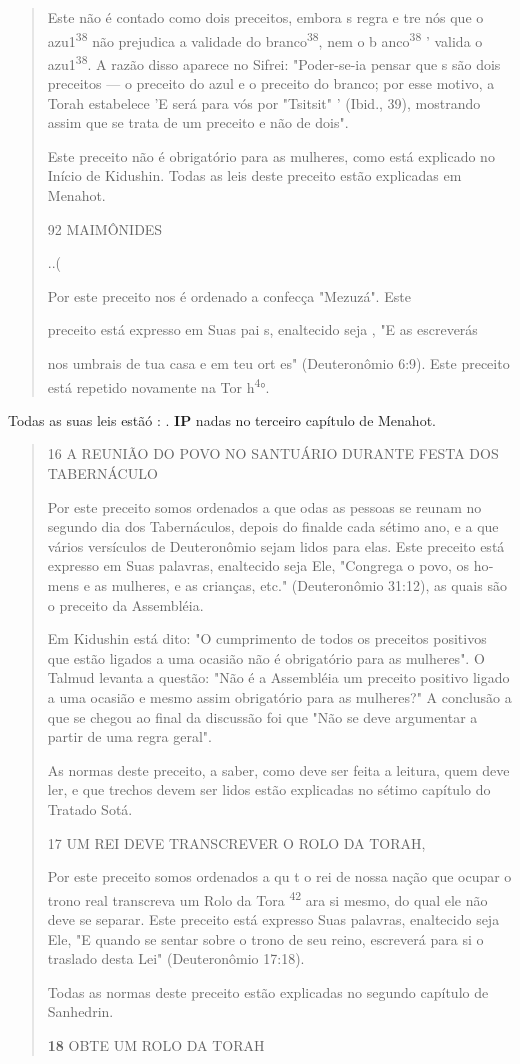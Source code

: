 \begin{quote}
Este não é contado como dois preceitos, embora s regra e tre nós que o
azu1\textsuperscript{38} não prejudica a validade do
branco\textsuperscript{38}, nem o b anco\textsuperscript{38} ' valida o
azu1\textsuperscript{38}. A razão disso aparece no Sifrei: "Poder-se-ia
pensar que s são dois preceitos --- o preceito do azul e o preceito do
branco; por esse motivo, a To­rah estabelece 'E será para vós por
"Tsitsit" ' (Ibid., 39), mostrando assim que se trata de um preceito e
não de dois".

Este preceito não é obrigatório para as mulheres, como está explicado no
Início de Kidushin. Todas as leis deste preceito estão explicadas em
Menahot.

92 MAIMÔNIDES

..(

Por este preceito nos é ordenado a confecça "Mezuzá". Este

preceito está expresso em Suas pai s, enaltecido seja , "E as escreverás

nos umbrais de tua casa e em teu ort es" (Deuteronômio 6:9). Este
preceito está repetido novamente na Tor h\textsuperscript{4}°.
\end{quote}

Todas as suas leis estãó : . \textbf{IP} nadas no terceiro capítulo de
Menahot.

\begin{quote}
16 A REUNIÃO DO POVO NO SANTUÁRIO DURANTE FESTA DOS TABERNÁCULO

Por este preceito somos ordenados a que odas as pessoas se reu­nam no
segundo dia dos Tabernáculos, depois do finalde cada sétimo ano, e a que
vários versículos de Deuteronômio sejam lidos para elas. Este preceito
está expresso em Suas palavras, enaltecido seja Ele, "Congrega o povo,
os ho­mens e as mulheres, e as crianças, etc." (Deuteronômio 31:12), as
quais são o preceito da Assembléia.

Em Kidushin está dito: "O cumprimento de todos os preceitos posi­tivos
que estão ligados a uma ocasião não é obrigatório para as mulheres". O
Talmud levanta a questão: "Não é a Assembléia um preceito positivo
ligado a uma ocasião e mesmo assim obrigatório para as mulheres?" A
conclusão a que se chegou ao final da discussão foi que "Não se deve
argumentar a partir de uma regra geral".

As normas deste preceito, a saber, como deve ser feita a leitura, quem
deve ler, e que trechos devem ser lidos estão explicadas no sétimo
capítulo do Tratado Sotá.

17 UM REI DEVE TRANSCREVER O ROLO DA TORAH,

Por este preceito somos ordenados a qu t o rei de nossa nação que ocupar
o trono real transcreva um Rolo da Tora \textsuperscript{42} ara si
mesmo, do qual ele não deve se separar. Este preceito está expresso Suas
palavras, enalteci­do seja Ele, "E quando se sentar sobre o trono de seu
reino, escreverá para si o traslado desta Lei" (Deuteronômio 17:18).

Todas as normas deste preceito estão explicadas no segundo capítu­lo de
Sanhedrin.

\textbf{18} OBTE UM ROLO DA TORAH
\end{quote}

